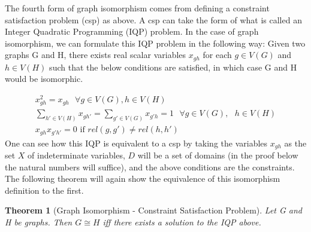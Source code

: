 \documentclass[12pt]{article}
\newtheorem{Theorem}{Theorem}
\theoremstyle{definition}
\theoremstyle{proposition}
\theoremstyle{lemma}
\begin{document}
The fourth form of graph isomorphism comes from defining a constraint satisfaction problem (csp) as above. A csp can take the form of what is called an Integer Quadratic Programming (IQP) problem. In the case of graph isomorphism, we can formulate this IQP problem in the following way: Given two graphs G and H, there exists real scalar variables $x_{gh}$ for each $g \in V(G)$ and $h \in V(H)$ such that the below conditions are satisfied, in which case G and H would be isomorphic. 

\begin{subequations}
\label{IQP}
\begin{align}
x_{gh}^2 = x_{gh} \text{  } \forall g \in V(G), h \in V(H)
\\
\sum_{h' \in V(H)} x_{gh'} = \sum_{g' \in V(G)} x_{g'h} = 1 \text{  } \forall g \in V(G), \text{  } h \in V(H)
\\
x_{gh}x_{g'h'} = 0 \text{ if } rel(g, g') \neq rel(h, h')
\end{align}
\end{subequations}
One can see how this IQP is equivalent to a csp by taking the variables $x_{gh}$ as the set $X$ of indeterminate variables, $D$ will be a set of domains (in the proof below the natural numbers will suffice), and the above conditions are the constraints. The following theorem will again show the equivalence of this isomorphism definition to the first.

\begin{Theorem}[Graph Isomorphism - Constraint Satisfaction Problem]
Let G and H be graphs. Then $G \cong H$ iff there exists a solution to the IQP above.
\end{Theorem}
\end{document}
